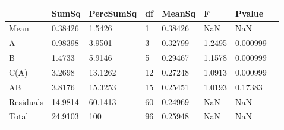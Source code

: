 \begin{table} 
\begin{tabular}{llllllll}
 & SumSq & PercSumSq & df & MeanSq & F & Pvalue \\ 
 \hline 
Mean & 0.38426 & 1.5426 & 1 & 0.38426 & NaN & NaN \\ 
A & 0.98398 & 3.9501 & 3 & 0.32799 & 1.2495 & 0.000999 \\ 
B & 1.4733 & 5.9146 & 5 & 0.29467 & 1.1578 & 0.000999 \\ 
C(A) & 3.2698 & 13.1262 & 12 & 0.27248 & 1.0913 & 0.000999 \\ 
AB & 3.8176 & 15.3253 & 15 & 0.25451 & 1.0193 & 0.17383 \\ 
Residuals & 14.9814 & 60.1413 & 60 & 0.24969 & NaN & NaN \\ 
Total & 24.9103 & 100 & 96 & 0.25948 & NaN & NaN \\ 
\end{tabular} 
\end{table} 
